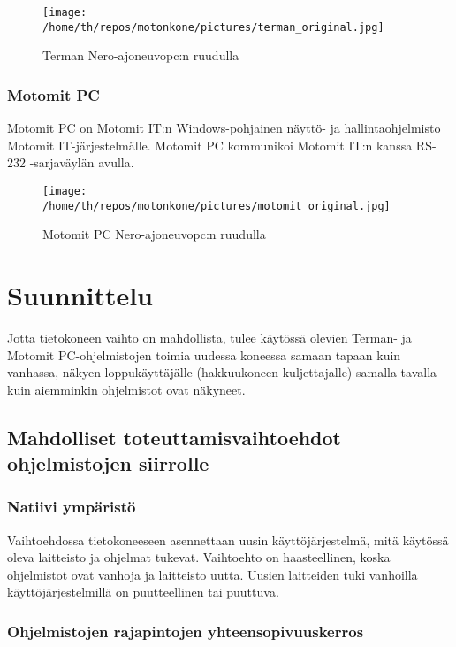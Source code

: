 \documentclass[11pt,a4paper,oneside,article]{memoir}
\begin{document}
\begin{figure}[H]
\centering
\texttt{[image: /home/th/repos/motonkone/pictures/terman\_original.jpg]}
\caption{Terman Nero-ajoneuvopc:n ruudulla}
\end{figure}

\subsection{Motomit PC}
Motomit PC on Motomit IT:n Windows-pohjainen näyttö- ja hallintaohjelmisto Motomit IT-järjestelmälle. Motomit PC kommunikoi Motomit IT:n kanssa RS-232 -sarjaväylän avulla. \cite{motomit:esite}

\begin{figure}[H]
\centering
\texttt{[image: /home/th/repos/motonkone/pictures/motomit\_original.jpg]}
\caption{Motomit PC Nero-ajoneuvopc:n ruudulla}
\end{figure}

\chapter{Suunnittelu}

Jotta tietokoneen vaihto on mahdollista, tulee käytössä olevien Terman- ja Motomit PC-ohjelmistojen toimia uudessa koneessa samaan tapaan kuin vanhassa, näkyen loppukäyttäjälle (hakkuukoneen kuljettajalle) samalla tavalla kuin aiemminkin ohjelmistot ovat näkyneet.

\section{Mahdolliset toteuttamisvaihtoehdot ohjelmistojen siirrolle}

\subsection{Natiivi ympäristö}

Vaihtoehdossa tietokoneeseen asennettaan uusin käyttöjärjestelmä, mitä
käytössä oleva laitteisto ja ohjelmat tukevat. Vaihtoehto on
haasteellinen, koska ohjelmistot ovat vanhoja ja laitteisto uutta.
Uusien laitteiden tuki vanhoilla käyttöjärjestelmillä on puutteellinen
tai puuttuva.

\subsection{Ohjelmistojen rajapintojen
yhteensopivuuskerros}
\end{document}
